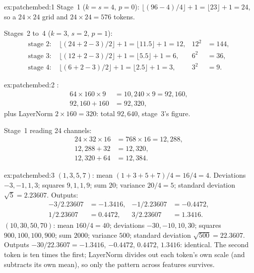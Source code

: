 
\begin{solution}{ex:patchembed:1}
Stage~1 ($k=s=4$, $p=0$): $\lfloor(96-4)/4\rfloor + 1 = \lfloor 23\rfloor + 1 = 24$, so a
$24\times24$ grid and $24\times24 = 576$ tokens.

Stages~2 to~4 ($k=3$, $s=2$, $p=1$):
\begin{align*}
\text{stage 2: } & \lfloor(24 + 2 - 3)/2\rfloor + 1 = \lfloor 11.5\rfloor + 1 = 12, & 12^2 &= 144,\\
\text{stage 3: } & \lfloor(12 + 2 - 3)/2\rfloor + 1 = \lfloor 5.5\rfloor + 1 = 6, & 6^2 &= 36,\\
\text{stage 4: } & \lfloor(6 + 2 - 3)/2\rfloor + 1 = \lfloor 2.5\rfloor + 1 = 3, & 3^2 &= 9.
\end{align*}
\end{solution}

\begin{solution}{ex:patchembed:2}
:
\begin{align*}
64\times160\times9 &= 10{,}240\times9 = 92{,}160,\\
92{,}160 + 160 &= 92{,}320,
\end{align*}
plus LayerNorm $2\times160 = 320$: total $92{,}640$, stage~3's figure.

Stage~1 reading 24 channels:
\begin{align*}
24\times32\times16 &= 768\times16 = 12{,}288,\\
12{,}288 + 32 &= 12{,}320,\\
12{,}320 + 64 &= 12{,}384.
\end{align*}
\end{solution}

\begin{solution}{ex:patchembed:3}
$(1,3,5,7)$: mean $(1+3+5+7)/4 = 16/4 = 4$. Deviations $-3, -1, 1, 3$; squares $9, 1, 1, 9$; sum
$20$; variance $20/4 = 5$; standard deviation $\sqrt5 = 2.23607$. Outputs:
\begin{align*}
-3/2.23607 &= -1.3416, & -1/2.23607 &= -0.4472,\\
1/2.23607 &= 0.4472, & 3/2.23607 &= 1.3416.
\end{align*}
$(10,30,50,70)$: mean $160/4 = 40$; deviations $-30,-10,10,30$; squares $900,100,100,900$; sum
$2000$; variance $500$; standard deviation $\sqrt{500} = 22.3607$. Outputs $-30/22.3607 = -1.3416$,
$-0.4472$, $0.4472$, $1.3416$: identical. The second token is ten times the first; LayerNorm divides out
each token's own scale (and subtracts its own mean), so only the pattern across features survives.
\end{solution}

